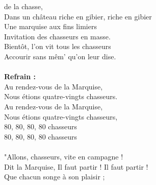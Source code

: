 
 de la chasse,
\\Dans un château riche en gibier, riche en gibier
\\Une marquise aux fins limiers
\\Invitation des chasseurs en masse.
\\Bientôt, l'on vit tous les chasseurs
\\Accourir sans mêm' qu'on leur dise.
\\\\\textbf{Refrain :}
\\Au rendez-vous de la Marquise,
\\Nous étions quatre-vingts chasseurs.
\\Au rendez-vous de la Marquise,
\\Nous étions quatre-vingts chasseurs,
\\80, 80, 80, 80 chasseurs
\\80, 80, 80, 80 chasseurs
\\\\"Allons, chasseurs, vite en campagne !
\\Dit la Marquise, Il faut partir ! Il faut partir !
\\Que chacun songe à son plaisir ;
